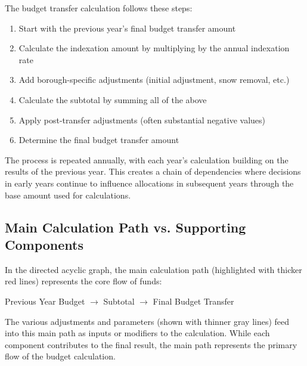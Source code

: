 \documentclass{article}
\begin{document}
The budget transfer calculation follows these steps:

\begin{enumerate}
\item Start with the previous year's final budget transfer amount
\item Calculate the indexation amount by multiplying by the annual indexation rate
\item Add borough-specific adjustments (initial adjustment, snow removal, etc.)
\item Calculate the subtotal by summing all of the above
\item Apply post-transfer adjustments (often substantial negative values)
\item Determine the final budget transfer amount
\end{enumerate}

The process is repeated annually, with each year's calculation building on the results of the previous year. This creates a chain of dependencies where decisions in early years continue to influence allocations in subsequent years through the base amount used for calculations.

\subsection{Main Calculation Path vs. Supporting Components}

In the directed acyclic graph, the main calculation path (highlighted with thicker red lines) represents the core flow of funds:

\begin{center}
Previous Year Budget $\rightarrow$ Subtotal $\rightarrow$ Final Budget Transfer
\end{center}

The various adjustments and parameters (shown with thinner gray lines) feed into this main path as inputs or modifiers to the calculation. While each component contributes to the final result, the main path represents the primary flow of the budget calculation.
\end{document}
